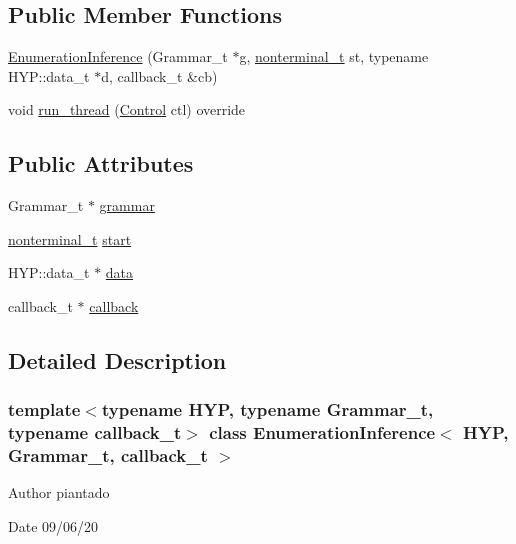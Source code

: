 \subsection*{Public Member Functions}
\begin{DoxyCompactItemize}
\item 
\hyperlink{class_enumeration_inference_acce2365fb3b45ab53414d5dd93c18f11}{Enumeration\+Inference} (Grammar\+\_\+t $\ast$g, \hyperlink{_nonterminal_8h_a1c5bfe9b903f69c83bbde5da7035fef3}{nonterminal\+\_\+t} st, typename H\+Y\+P\+::data\+\_\+t $\ast$d, callback\+\_\+t \&cb)
\item 
void \hyperlink{class_enumeration_inference_a257f7b3346772057c6f5b7ff049a9350}{run\+\_\+thread} (\hyperlink{struct_control}{Control} ctl) override
\end{DoxyCompactItemize}
\subsection*{Public Attributes}
\begin{DoxyCompactItemize}
\item 
Grammar\+\_\+t $\ast$ \hyperlink{class_enumeration_inference_a5bba83e097730fd566d0a47336c9473d}{grammar}
\item 
\hyperlink{_nonterminal_8h_a1c5bfe9b903f69c83bbde5da7035fef3}{nonterminal\+\_\+t} \hyperlink{class_enumeration_inference_af8fdb3bdee96254a2d35346cf5fb8450}{start}
\item 
H\+Y\+P\+::data\+\_\+t $\ast$ \hyperlink{class_enumeration_inference_a74a0f7bcc9701f2078a9dedea4352e63}{data}
\item 
callback\+\_\+t $\ast$ \hyperlink{class_enumeration_inference_a792b247c4874b9f879ac204749bea1c3}{callback}
\end{DoxyCompactItemize}


\subsection{Detailed Description}
\subsubsection*{template$<$typename H\+YP, typename Grammar\+\_\+t, typename callback\+\_\+t$>$\newline
class Enumeration\+Inference$<$ H\+Y\+P, Grammar\+\_\+t, callback\+\_\+t $>$}

\begin{DoxyAuthor}{Author}
piantado 
\end{DoxyAuthor}
\begin{DoxyDate}{Date}
09/06/20 
\end{DoxyDate}


